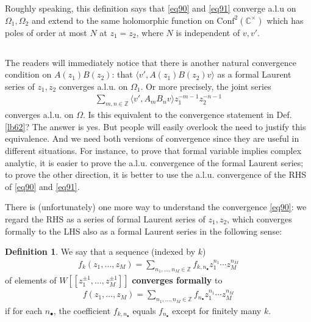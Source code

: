 \documentclass[12pt,a4paper,notitlepage]{article}
\theoremstyle{definition}
\newtheorem{df}{Definition}[section]
\theoremstyle{plain}
\newcommand{\Conf}{\mathrm{Conf}}
\newcommand{\bk}[1]{\langle {#1}\rangle}
\newcommand{\blt}{\bullet}
\newcommand{\Cbb}{\mathbb C}
\newcommand{\Zbb}{\mathbb Z}
\numberwithin{equation}{section}
\begin{document}
Roughly speaking, this definition says that \eqref{eq90} and \eqref{eq91} converge a.l.u on $\Omega_1,\Omega_2$ and extend to the same holomorphic function on $\Conf^2(\Cbb^\times)$ which has poles of order at most $N$ at $z_1=z_2$, where $N$ is independent of $v,v'$.




\subsection{}

The readers will immediately notice that there is another natural convergence condition on $A(z_1)B(z_2)$: that $\bk{v',A(z_1)B(z_2)v}$ as a formal Laurent series of $z_1,z_2$ converges a.l.u. on $\Omega_1$. Or  more precisely, the joint series
\begin{align}
\sum_{m,n\in\Zbb}\bk{v',A_mB_nv}z_1^{-m-1}z_2^{-n-1}\label{eq96}	
\end{align}
converges a.l.u. on $\Omega$. Is this equivalent to the convergence statement in Def. \ref{lb62}? The answer is yes. But people will easily overlook the need to justify this equivalence. And we need both versions of convergence since they are useful in different situations. For instance, to prove that formal variable implies complex analytic, it is easier to prove the a.l.u. convergence of the formal Laurent series; to prove the other direction, it is better to use the a.l.u. convergence of the RHS of \eqref{eq90} and \eqref{eq91}.

There is (unfortunately) one more way to understand the convergence \eqref{eq90}: we regard the RHS as a series of formal Laurent series of $z_1,z_2$, which converges formally to the LHS also as a formal Laurent series in the following sense:


\begin{df}\label{lb66}
	We say that a sequence (indexed by $k$)
	\begin{align*}
		f_k(z_1,\dots,z_M)=\sum_{n_1,\dots,n_M\in\Zbb}f_{k,n_\blt}z_1^{n_1}\cdots z_M^{n_M}	
	\end{align*}
	of elements of $W[[z_1^{\pm1},\dots,z_M^{\pm1}]]$ \textbf{converges formally} to
	\begin{align*}
		f(z_1,\dots,z_M)=\sum_{n_1,\dots,n_M\in\Zbb}f_{n_\blt}z_1^{n_1}\cdots z_M^{n_M}	
	\end{align*}
	if for each $n_\blt$, the coefficient $f_{k,n_\blt}$ equals $f_{n_\blt}$ except for finitely many $k$.
\end{df}
\end{document}
